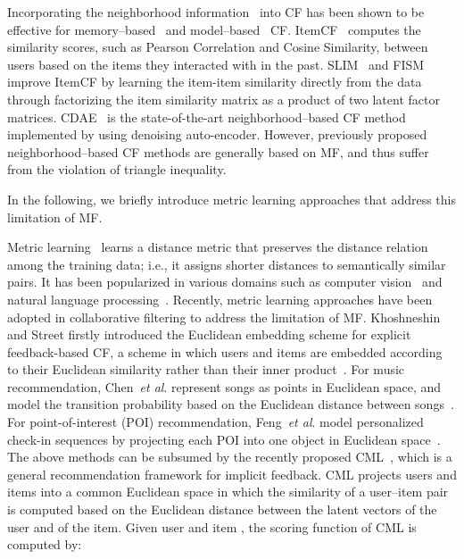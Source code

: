 \documentclass[conference]{IEEEtran}
\newcommand{\etal}{\textit{et al}. }
\begin{document}
Incorporating the neighborhood information~\cite{desrosiers2011comprehensive} into CF has been shown to be effective for memory--based~\cite{sarwar2001item} and model--based~\cite{ning2011slim,kabbur2013fism,wu2016collaborative,koren2008factorization} CF. 
ItemCF~\cite{sarwar2001item} computes the similarity scores, such as Pearson Correlation and Cosine Similarity, between users based on the items they interacted with in the past.
SLIM~\cite{ning2011slim} and FISM~\cite{kabbur2013fism} improve ItemCF by learning the item-item similarity directly from the data through factorizing the item similarity matrix as a product of two latent factor matrices. CDAE~\cite{wu2016collaborative} is the state-of-the-art neighborhood--based CF method implemented by using denoising auto-encoder. However, previously proposed neighborhood--based CF methods are generally based on MF, and thus suffer from the violation of triangle inequality.

In the following, we briefly introduce metric learning approaches that address this limitation of MF.


\smallskip
{}
Metric learning~\cite{yang2006distance} learns a distance metric that preserves the distance relation among the training data; i.e., it assigns shorter distances to semantically similar pairs. It has been popularized in various domains such as computer vision~\cite{bellet2013survey} and natural language processing~\cite{lebanon2006metric}. Recently, metric learning approaches have been adopted in collaborative filtering to address the limitation of MF.
Khoshneshin and Street firstly introduced the Euclidean embedding scheme for explicit feedback-based CF, a scheme in which users and items are embedded according to their Euclidean similarity rather than their inner product~\cite{khoshneshin2010collaborative}. For music recommendation, Chen~\etal represent songs as points in Euclidean space, and model the transition probability based on the Euclidean distance between songs~\cite{chen2012playlist}. For point-of-interest (POI) recommendation, Feng~\etal model personalized check-in sequences by projecting each POI into one object in Euclidean space~\cite{feng2015personalized}. 
The above methods can be subsumed by the recently proposed CML~\cite{hsieh2017collaborative}, which is a general recommendation framework for implicit feedback. CML projects users and items into a common Euclidean space in which the similarity of a user--item pair is computed based on the Euclidean distance between the latent vectors of the user and of the item. Given user  and item , the scoring function  of CML is computed by:
\end{document}
